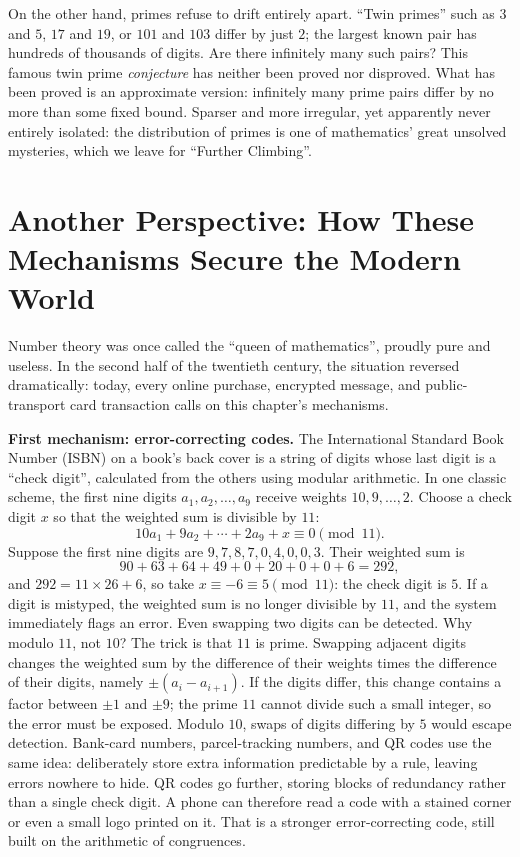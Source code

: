 On the other hand, primes refuse to drift entirely apart. ``Twin primes'' such as $3$ and $5$, $17$ and $19$, or $101$ and $103$ differ by just $2$; the largest known pair has hundreds of thousands of digits. Are there infinitely many such pairs? This famous twin prime \emph{conjecture} has neither been proved nor disproved. What has been proved is an approximate version: infinitely many prime pairs differ by no more than some fixed bound. Sparser and more irregular, yet apparently never entirely isolated: the distribution of primes is one of mathematics' great unsolved mysteries, which we leave for ``Further Climbing''.

\section{Another Perspective: How These Mechanisms Secure the Modern World}

Number theory was once called the ``queen of mathematics'', proudly pure and useless. In the second half of the twentieth century, the situation reversed dramatically: today, every online purchase, encrypted message, and public-transport card transaction calls on this chapter's mechanisms.

\textbf{First mechanism: error-correcting codes.} The International Standard Book Number (ISBN) on a book's back cover is a string of digits whose last digit is a ``check digit'', calculated from the others using modular arithmetic. In one classic scheme, the first nine digits $a_1,a_2,\dots,a_9$ receive weights $10,9,\dots,2$. Choose a check digit $x$ so that the weighted sum is divisible by $11$:
\[
10a_1+9a_2+\cdots+2a_9+x\equiv0\pmod{11}.
\]
Suppose the first nine digits are $9,7,8,7,0,4,0,0,3$. Their weighted sum is
\[
90+63+64+49+0+20+0+0+6=292,
\]
and $292=11\times26+6$, so take $x\equiv-6\equiv5\pmod{11}$: the check digit is $5$. If a digit is mistyped, the weighted sum is no longer divisible by $11$, and the system immediately flags an error. Even swapping two digits can be detected. Why modulo $11$, not $10$? The trick is that $11$ is prime. Swapping adjacent digits changes the weighted sum by the difference of their weights times the difference of their digits, namely $\pm(a_i-a_{i+1})$. If the digits differ, this change contains a factor between $\pm1$ and $\pm9$; the prime $11$ cannot divide such a small integer, so the error must be exposed. Modulo $10$, swaps of digits differing by $5$ would escape detection. Bank-card numbers, parcel-tracking numbers, and QR codes use the same idea: deliberately store extra information predictable by a rule, leaving errors nowhere to hide. QR codes go further, storing blocks of redundancy rather than a single check digit. A phone can therefore read a code with a stained corner or even a small logo printed on it. That is a stronger error-correcting code, still built on the arithmetic of congruences.

